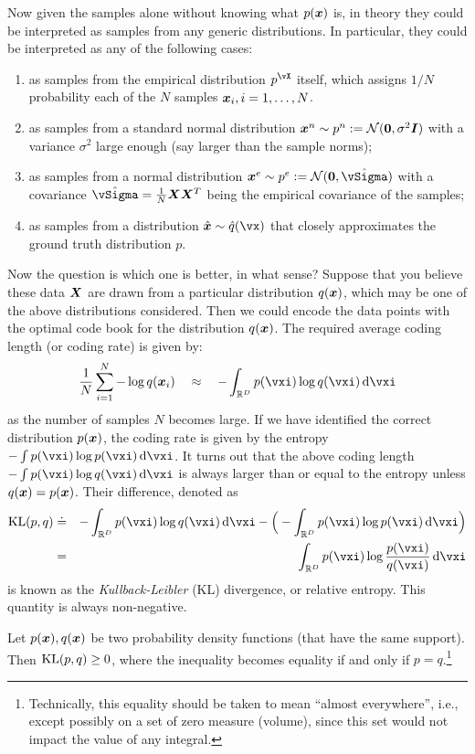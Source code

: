 \documentclass[../../book-main.tex]{subfiles}
\begin{document}
Now given the samples alone without knowing what $p(\bm{x})$ is, in theory they could be interpreted as samples from any generic distributions. In particular, they could be interpreted as any of the following cases:
\begin{enumerate}
	\item as samples from the empirical distribution $p^{\vX}$ itself, which assigns $1/N$ probability each of the $N$ samples $\bm{x}_i, i=1, \ldots, N$.
	\item as samples from a standard normal distribution $\bm{x}^n \sim p^{n} := \mathcal{N}(\boldsymbol{0}, \sigma^2 \boldsymbol{I})$ with a variance $\sigma^2$ large enough (say larger than the sample norms);
	\item as samples from a normal distribution $\x^e \sim p^{e} := \mathcal{N}(\boldsymbol{0}, \hat{\vSigma})$ with a covariance $\hat{\vSigma} = \frac{1}{N} \X \X^T$ being the empirical covariance of the samples;
	\item as samples from a distribution $\hat \x \sim \hat{q}(\vx)$ that closely approximates the ground truth  distribution $p$.
\end{enumerate}
Now the question is which one is better, in what sense? Suppose that you believe these data $\bm{X}$ are drawn from a particular distribution  $q(\bm{x})$, which may be one of the above distributions considered. Then we could encode the data points with the optimal code book for the distribution $q(\bm{x})$. The required average coding length (or coding rate) is given by:
\begin{equation}
	\frac{1}{N}\sum_{i=1}^N -\log q(\x_i) \quad \approx \quad - \int_{\R^{D}} p(\vxi) \log q(\vxi)\odif{\vxi}
\end{equation}
as the number of samples $N$ becomes large. If we have identified the correct distribution $p(\bm{x})$, the coding rate is given by the entropy $- \int p(\vxi) \log p(\vxi) \odif{\vxi}$. It turns out that the above coding length $- \int p(\vxi) \log q(\vxi) \odif{\vxi}$ is always larger than or equal to the entropy unless $q(\bm{x}) = p(\bm{x})$. Their difference, denoted as
\begin{eqnarray}
	\KL(p, q) &\doteq& - \int_{\R^{D}} p(\vxi) \log q(\vxi) \odif{\vxi}  - \Big(- \int_{\R^{D}} p(\vxi) \log p(\vxi) \odif{\vxi} \Big)\\
	&=& \int_{\R^{D}} p(\vxi) \log \frac{p(\vxi)}{q(\vxi)} \odif{\vxi}
\end{eqnarray}
is known as the {\em Kullback-Leibler} (KL) divergence, or relative entropy. This quantity is always non-negative.
\begin{theorem}\label{thm:information-inequality}
	Let $p(\bm{x}), q(\bm{x})$ be two probability density functions (that have the same support). Then $\operatorname{KL}(p, q) \ge 0$, where the inequality becomes equality if and only if $p = q$.\footnote{Technically, this equality should be taken to mean ``almost everywhere'', i.e., except possibly on a set of zero measure (volume), since this set would not impact the value of any integral.}
\end{theorem}
\end{document}
